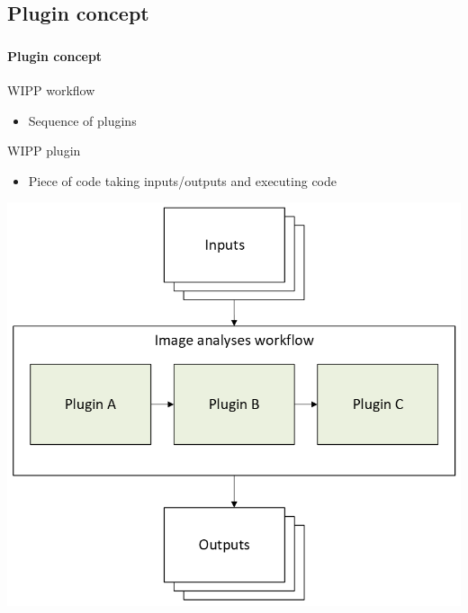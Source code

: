 \def\slidetitle{Plugin concept}

\subsection{\slidetitle}
\begin{frame}
  \frametitle{\sectiontitle}
  \framesubtitle{\slidetitle}

  \begin{minipage}[h!]{0.40\textwidth}
    WIPP workflow
    \begin{itemize}
      \item Sequence of plugins
    \end{itemize}

    \bigskip

    WIPP plugin
    \begin{itemize}
      \item Piece of code taking inputs/outputs and executing code
    \end{itemize}
  \end{minipage}\hfill
  \begin{minipage}[h!]{0.55\textwidth}
    \includegraphics[scale=0.55]{./img/1_background/plugins.png}
  \end{minipage}
\end{frame}

\def\slidetitle{AI model cards}

